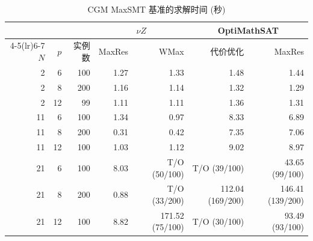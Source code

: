 \begin{table}[!htbp]
\centering
\caption{CGM MaxSMT 基准的求解时间 (秒)}
\label{tab:exp-maxsmt}
\small
\setlength{\tabcolsep}{3pt}
\begin{tabular}{@{}rrr rrrr@{}}
\toprule
& & & \multicolumn{2}{c}{$\nu Z$} & \multicolumn{2}{c}{OptiMathSAT} \\
\cmidrule(lr){4-5}\cmidrule(lr){6-7}
$N$ & $p$ & 实例数 & MaxRes & WMax & 代价优化 & MaxRes \\
\midrule
2 & 6 & 100 & 1.27 & 1.33 & 1.48 & 1.44 \\
2 & 8 & 200 & 1.16 & 1.14 & 1.32 & 1.29 \\
2 & 12 & 99 & 1.11 & 1.11 & 1.36 & 1.31 \\
\midrule
11 & 6 & 100 & 1.34 & 0.97 & 8.33 & 6.89 \\
11 & 8 & 200 & 0.31 & 0.42 & 7.35 & 7.06 \\
11 & 12 & 100 & 1.03 & 1.12 & 9.02 & 8.97 \\
\midrule
21 & 6 & 100 & 8.03 & T/O (50/100) & T/O (39/100) & 43.65 (99/100) \\
21 & 8 & 200 & 0.88 & T/O (33/200) & 112.04 (169/200) & 146.41 (139/200) \\
21 & 12 & 100 & 8.82 & 171.52 (75/100) & T/O (30/100) & 93.49 (93/100) \\
\bottomrule
\end{tabular}
\end{table}
